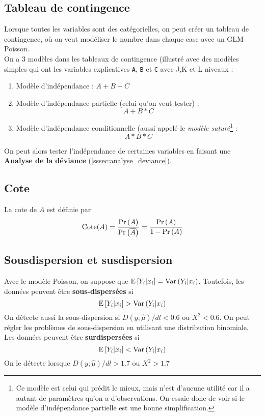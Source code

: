 \documentclass[10pt, french]{article}
\begin{document}
\begin{multicols*}{3}
\subsection*{Tableau de contingence}
Lorsque toutes les variables sont des catégorielles, on peut créer un tableau de contingence, où on veut modéliser le nombre dans chaque case avec un GLM Poisson. \\

On a 3 modèles dans les tableaux de contingence (illustré avec des modèles simples qui ont les variables explicatives \verb=A=, \verb=B= et \verb=C= avec J,K et L niveaux  : 
\begin{enumerate}[label=\faAngleRight]
\item Modèle d'indépendance : $A + B + C$

\item Modèle d'indépendance partielle (celui qu'on veut tester) : 
\[A + B * C\]

\item Modèle d'indépendance conditionnelle (aussi appelé le \emph{modèle saturé}\footnote{Ce modèle est celui qui prédit le mieux, mais n'est d'aucune utilité car il a autant de paramètres qu'on a d'observations. On essaie donc de voir si le modèle d'indépendance partielle est une bonne simplification.} : 
\[A * B * C\]
\end{enumerate}
On peut alors tester l'indépendance de certaines variables en faisant une \textbf{Analyse de la déviance} (\autoref{sssec:analyse_deviance}).


\subsection*{Cote}
La cote de $A$ est définie par
\[\mathrm{Cote}(A) = \frac{\Pr \left( A \right)}{\Pr \left( \overline{A} \right)} = \frac{\Pr \left( A \right)}{1 - \Pr \left( A \right)} \]


\subsection*{Sousdispersion et susdispersion}
Avec le modèle Poisson, on suppose que $\mathrm{E} \left[ Y_i |x_i \right] = \mathrm{Var} \left( Y_i | x_i \right)$. Toutefois, les données peuvent être \textbf{sous-dispersées} si
\[  \mathrm{E} \left[ Y_i |x_i \right] > \mathrm{Var} \left( Y_i | x_i \right) \]
On détecte aussi la sous-dispersion si $D(y ; \hat{\mu}) / dl < 0.6$ ou $X^2 < 0.6$. On peut régler les problèmes de sous-dispersion en utilisant une distribution binomiale. Les données peuvent être \textbf{surdispersées} si
\[ \mathrm{E} \left[ Y_i |x_i \right] < \mathrm{Var} \left( Y_i | x_i \right)  \]
On le détecte lorsque $D(y ; \hat{\mu}) / dl > 1.7$ ou $X^2 > 1.7$


\end{multicols*}
\end{document}
